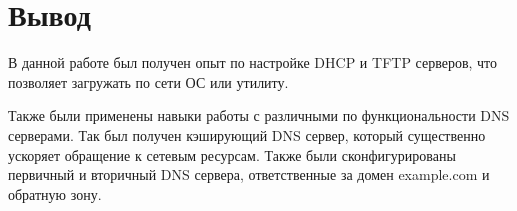\documentclass[14pt,a4paper,report]{report}
\begin{document}
\section*{Вывод}
В данной работе был получен опыт по настройке DHCP и TFTP серверов, что позволяет загружать по сети ОС или утилиту. 

Также были применены навыки работы с различными по функциональности DNS серверами. Так был получен кэширующий DNS сервер, который существенно ускоряет обращение к сетевым ресурсам. Также были сконфигурированы первичный и вторичный DNS сервера, ответственные за домен example.com и обратную зону.

%
%
\end{document}

